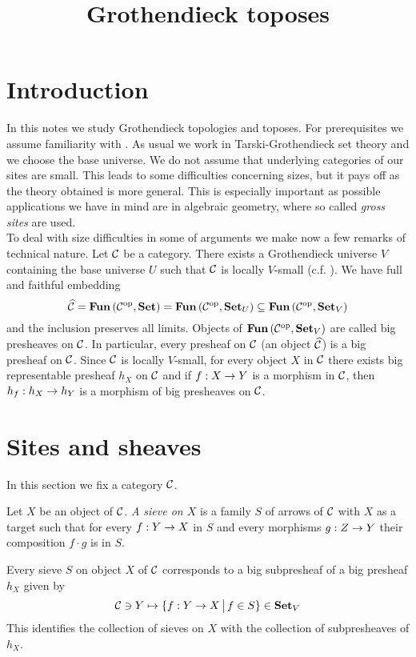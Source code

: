 



\title{Grothendieck toposes}
\date{}
\maketitle

\section{Introduction}
\noindent
In this notes we study Grothendieck topologies and toposes. For prerequisites we assume familiarity with \cite{Presheaves}. As usual we work in Tarski-Grothendieck set theory and we choose the base universe. We do not assume that underlying categories of our sites are small. This leads to some difficulties concerning sizes, but it pays off as the theory obtained is more general. This is especially important as possible applications we have in mind are in algebraic geometry, where so called \textit{gross sites} are used.\\
To deal with size difficulties in some of arguments we make now a few remarks of technical nature. Let ${\mathcal C}$ be a category. There exists a Grothendieck universe $V$ containing the base universe $U$ such that ${\mathcal C}$ is locally $V$-small (c.f. {\cite[section 1]{Presheaves}}). We have full and faithful embedding
$$\widehat{{\mathcal C}} = \mathbf{Fun}\left({\mathcal C}^{\mathrm{op}},\mathbf{Set}\right) =  \mathbf{Fun}\left({\mathcal C}^{\mathrm{op}},\mathbf{Set}_U\right)\subseteq  \mathbf{Fun}\left({\mathcal C}^{\mathrm{op}},\mathbf{Set}_V\right)$$
and the inclusion preserves all limits. Objects of $\mathbf{Fun}\left({\mathcal C}^{\mathrm{op}},\mathbf{Set}_V\right)$ are called big presheaves on ${\mathcal C}$. In particular, every presheaf on ${\mathcal C}$ (an object $\widehat{{\mathcal C}}$) is a big presheaf on ${\mathcal C}$. Since ${\mathcal C}$ is locally $V$-small, for every object $X$ in ${\mathcal C}$ there exists big representable presheaf $h_X$ on ${\mathcal C}$ and if $f:X\rightarrow Y$ is a morphism in ${\mathcal C}$, then $h_f:h_X\rightarrow h_Y$ is a morphism of big presheaves on ${\mathcal C}$.

\section{Sites and sheaves}
\noindent
In this section we fix a category ${\mathcal C}$.

\begin{definition}
Let $X$ be an object of ${\mathcal C}$. \textit{A sieve on $X$} is a family $S$ of arrows of ${\mathcal C}$ with $X$ as a target such that for every $f:Y\rightarrow X$ in $S$ and every morphisms $g:Z\rightarrow Y$ their composition $f\cdot g$ is in $S$.
\end{definition}
\noindent
Every sieve $S$ on object $X$ of ${\mathcal C}$ corresponds to a big subpresheaf of a big presheaf $h_X$ given by
$${\mathcal C}\ni Y\mapsto \{f:Y\rightarrow X\,\big|\,f\in S\}\in \mathbf{Set}_V$$
This identifies the collection of sieves on $X$ with the collection of subpresheaves of $h_X$.

